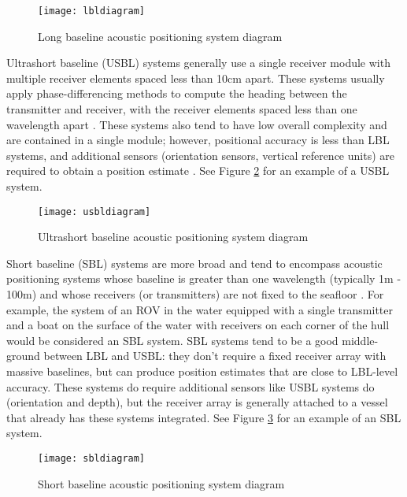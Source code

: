 \documentclass[12pt,a4paper]{report}
\begin{document}
\begin{figure}[htbp]
	\centering
	\texttt{[image: lbldiagram]}
	\caption{Long baseline acoustic positioning system diagram \cite{practicaloverview}}
	\label{fig:lbldiagram}
\end{figure}

Ultrashort baseline (USBL) systems generally use a single receiver module with multiple receiver elements spaced less than 10cm apart. These systems usually apply phase-differencing methods to compute the heading between the transmitter and receiver, with the receiver elements spaced less than one wavelength apart \cite{apomab}. These systems also tend to have low overall complexity and are contained in a single module; however, positional accuracy is less than LBL systems, and additional sensors (orientation sensors, vertical reference units) are required to obtain a position estimate \cite{practicaloverview}. See Figure \ref{fig:usbldiagram} for an example of a USBL system.

\begin{figure}[htbp]
	\centering
	\texttt{[image: usbldiagram]}
	\caption{Ultrashort baseline acoustic positioning system diagram \cite{practicaloverview}}
	\label{fig:usbldiagram}
\end{figure}

Short baseline (SBL) systems are more broad and tend to encompass acoustic positioning systems whose baseline is greater than one wavelength (typically 1m - 100m) and whose receivers (or transmitters) are not fixed to the seafloor \cite{surveyurpn}. For example, the system of an ROV in the water equipped with a single transmitter and a boat on the surface of the water with receivers on each corner of the hull would be considered an SBL system. SBL systems tend to be a good middle-ground between LBL and USBL: they don’t require a fixed receiver array with massive baselines, but can produce position estimates that are close to LBL-level accuracy. These systems do require additional sensors like USBL systems do (orientation and depth), but the receiver array is generally attached to a vessel that already has these systems integrated. See Figure \ref{fig:sbldiagram} for an example of an SBL system.

\begin{figure}[htbp]
	\centering
	\texttt{[image: sbldiagram]}
	\caption{Short baseline acoustic positioning system diagram \cite{practicaloverview}}
	\label{fig:sbldiagram}
\end{figure}
\end{document}
